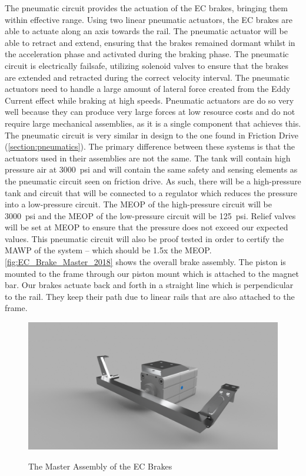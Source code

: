 \documentclass[main.tex]{subfiles}
\begin{document}
    The pneumatic circuit provides the actuation of the EC brakes, bringing them within effective range. Using two linear pneumatic actuators, the EC brakes are able to actuate along an axis towards the rail. The pneumatic actuator will be able to retract and extend, ensuring that the brakes remained dormant whilst in the acceleration phase and activated during the braking phase. The pneumatic circuit is electrically failsafe, utilizing solenoid valves to ensure that the brakes are extended and retracted during the correct velocity interval. The pneumatic actuators need to handle a large amount of lateral force created from the Eddy Current effect while braking at high speeds. Pneumatic actuators are do so very well because they can produce very large forces at low resource costs and do not require large mechanical assemblies, as it is a single component that achieves this. The pneumatic circuit is very similar in design to the one found in Friction Drive (\autoref{section:pneumatics}). The primary difference between these systems is that the actuators used in their assemblies are not the same.
    The tank will contain high pressure air at \SI{3000}{psi} and will contain the same safety and sensing elements as the pneumatic circuit seen on friction drive. As such, there will be a high-pressure tank and circuit that will be connected to a regulator which reduces the pressure into a low-pressure circuit. The MEOP of the high-pressure circuit will be \SI{3000}{psi} and the MEOP of the low-pressure circuit will be \SI{125}{psi}. Relief valves will be set at MEOP to ensure that the pressure does not exceed our expected values. This pneumatic circuit will also be proof tested in order to certify the MAWP of the system – which should be 1.5x the MEOP. \ref{fig:EC_Brake_Master_2018} shows the overall brake assembly. The piston is mounted to the frame through our piston mount which is attached to the magnet bar. Our brakes actuate back and forth in a straight line which is perpendicular to the rail. They keep their path due to linear rails that are also attached to the frame.
    \begin{figure}
    	\centering
        \includegraphics[width=\linewidth]{images/EC_Brake_Master_2018}
        \label{fig:EC_Assembly}
        \caption{The Master Assembly of the EC Brakes}
    \end{figure}
\end{document}
